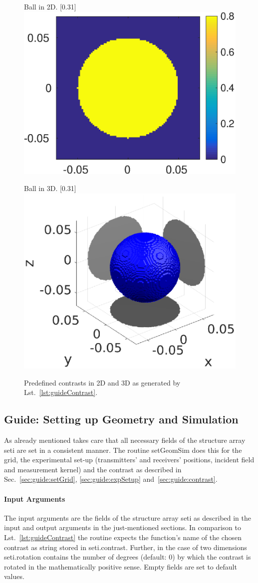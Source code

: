 \documentclass[a4paper]{article}
\begin{document}
\begin{figure}
\centering
\begin{subcaptionbox}{Ball in 2D.
  \label{fig:contrast:2D}}[0.31\textwidth]{
  \includegraphics[height=0.24\textwidth]{figs/fig_guideContrast2D}
  }
\end{subcaptionbox}
\begin{subcaptionbox}{Ball in 3D.
  \label{fig:contrast:3D}}[0.31\textwidth]{
  \includegraphics[height=0.26\textwidth]{figs/fig_guideContrast3D}
  }
\end{subcaptionbox}
\caption{Predefined contrasts in 2D and 3D as generated by Lst.~\ref{lst:guideContrast}.}
\label{fig:guide:contrast}
\end{figure}


\subsection{Guide: Setting up Geometry and Simulation}\label{sec:guide:setGeomSim}

As already mentioned \IPscatt takes care that all necessary fields of the structure array \textsf{seti} are set in a consistent manner. The routine \textsf{setGeomSim} does this for the grid, the experimental set-up (transmitters' and receivers' positions, incident field and measurement kernel) and the contrast as described in Sec.~\ref{sec:guide:setGrid}, \ref{sec:guide:expSetup} and~\ref{sec:guide:contrast}.

\paragraph{Input Arguments} The input arguments are the fields of the structure array \textsf{seti} as described in the input and output arguments in the just-mentioned sections. In comparison to Lst.~\ref{lst:guideContrast} the routine expects the function's name of the chosen contrast as string stored in \textsf{seti.contrast}. Further, in the case of two dimensions \textsf{seti.rotation} contains the number of degrees (default: 0) by which the contrast is rotated in the mathematically positive sense. Empty fields are set to default values.
\end{document}
